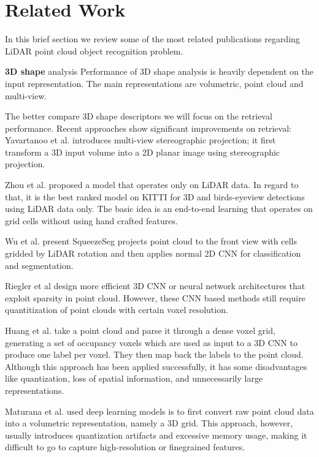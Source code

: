 \section{Related Work}\label{sec:relatedWork}
In this brief section we review some of the most related publications regarding LiDAR point cloud object recognition problem.

\textbf{3D shape} analysis Performance of 3D shape analysis is heavily dependent on the input representation. The main representations are volumetric, point cloud and multi-view.

The better compare 3D shape descriptors we will focus on the retrieval performance. Recent approaches show significant improvements on retrieval: Yavartanoo et al. \cite{DBLP:journals/corr/abs-1811-01571} introduces multi-view stereographic projection; it first transform a 3D input volume into a 2D planar image using stereographic projection.

Zhou et al. \cite{Zhou_2018_CVPR} proposed a model that operates only on LiDAR data. In regard to that, it is the best ranked model on KITTI \cite{geiger2012we} for 3D and birds-eyeview detections using LiDAR data only. The basic idea is an end-to-end learning that operates on grid cells without using hand crafted features.

Wu et al. \cite{DBLP:conf/icra/WuWYK18} present SqueezeSeg projects point cloud to the front view with cells gridded by LiDAR rotation and then applies normal 2D CNN for classification and segmentation.  

Riegler et al \cite{DBLP:conf/cvpr/RieglerUG17} design more efficient 3D CNN or neural network architectures that exploit sparsity in point cloud. However, these CNN based methods still require quantitization of point clouds with certain voxel resolution.

Huang et al. \cite{DBLP:conf/icpr/HuangY16} take a point cloud and parse it through a dense voxel grid, generating a set of occupancy voxels which are used as input to a 3D CNN to produce one label per voxel. They then map back the labels to the point cloud. Although this approach has been applied successfully, it has some disadvantages like quantization, loss of spatial information, and unnecessarily large representations.

Maturana et al. \cite{DBLP:conf/iros/MaturanaS15} used deep learning models is to first convert raw point cloud data into a volumetric representation, namely a 3D grid. This approach, however, usually introduces quantization artifacts and excessive memory usage, making it difficult to go to capture high-resolution or finegrained features.


